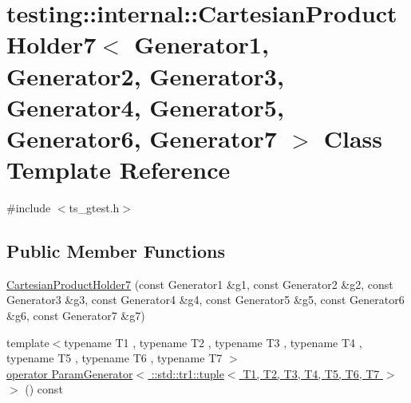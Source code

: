 \hypertarget{classtesting_1_1internal_1_1CartesianProductHolder7}{\section{testing\-:\-:internal\-:\-:Cartesian\-Product\-Holder7$<$ Generator1, Generator2, Generator3, Generator4, Generator5, Generator6, Generator7 $>$ Class Template Reference}
\label{classtesting_1_1internal_1_1CartesianProductHolder7}
}


{\ttfamily \#include $<$ts\-\_\-gtest.\-h$>$}

\subsection*{Public Member Functions}
\begin{DoxyCompactItemize}
\item 
\hyperlink{classtesting_1_1internal_1_1CartesianProductHolder7_a289e661f9252bac3570700410eb041b3}{Cartesian\-Product\-Holder7} (const Generator1 \&g1, const Generator2 \&g2, const Generator3 \&g3, const Generator4 \&g4, const Generator5 \&g5, const Generator6 \&g6, const Generator7 \&g7)
\item 
{\footnotesize template$<$typename T1 , typename T2 , typename T3 , typename T4 , typename T5 , typename T6 , typename T7 $>$ }\\\hyperlink{classtesting_1_1internal_1_1CartesianProductHolder7_a15534c2aff6f6d1ed6756d06b95b94e9}{operator Param\-Generator$<$ \-::std\-::tr1\-::tuple$<$ T1, T2, T3, T4, T5, T6, T7 $>$ $>$} () const 
\end{DoxyCompactItemize}


